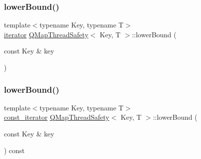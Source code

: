 \mbox{\label{class_q_map_thread_safety_a0589ec5e16479a92c0c50f86b32c1307}} 
\subsubsection{\texorpdfstring{lower\+Bound()}{lowerBound()}\hspace{0.1cm}{\footnotesize\ttfamily [1/2]}}
{\footnotesize\ttfamily template$<$typename Key, typename T$>$ \\
\hyperlink{class_q_map_thread_safety_a454c8af3f68e6d61aecaf1b918aa525b}{iterator} \hyperlink{class_q_map_thread_safety}{Q\+Map\+Thread\+Safety}$<$ Key, T $>$\+::lower\+Bound (\begin{DoxyParamCaption}\item[{const Key \&}]{key }\end{DoxyParamCaption})\hspace{0.3cm}{\ttfamily [inline]}}

\mbox{\label{class_q_map_thread_safety_a21e8f53194d173f6cedb8d60a86a4a19}} 
\subsubsection{\texorpdfstring{lower\+Bound()}{lowerBound()}\hspace{0.1cm}{\footnotesize\ttfamily [2/2]}}
{\footnotesize\ttfamily template$<$typename Key, typename T$>$ \\
\hyperlink{class_q_map_thread_safety_aa58d8479729f72b33e305a4d0ca957bd}{const\+\_\+iterator} \hyperlink{class_q_map_thread_safety}{Q\+Map\+Thread\+Safety}$<$ Key, T $>$\+::lower\+Bound (\begin{DoxyParamCaption}\item[{const Key \&}]{key }\end{DoxyParamCaption}) const\hspace{0.3cm}{\ttfamily [inline]}}

\mbox{\label{class_q_map_thread_safety_a48d648aa531db7c8ecd7f2efe2153707}} 
